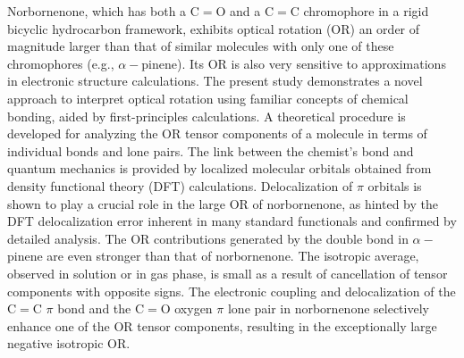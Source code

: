 \documentclass[landscape,a0b,final]{a0poster}
\newenvironment{poster}{
  \begin{center}
  \begin{minipage}[c]{0.98\textwidth}
}{
  \end{minipage} 
  \end{center}
}
\newenvironment{pcolumn}[1]{
  \begin{minipage}{#1\textwidth}
  \begin{center}
}{
  \end{center}
  \end{minipage}
}
\newcommand{\pbox}[4]{
\psshadowbox[#3]{
\begin{minipage}[t][#2][t]{#1}
#4
\end{minipage}
}}
\begin{document}
\begin{poster}
\begin{center}
\begin{pcolumn}{0.98}
{}
\end{pcolumn}
\end{center}

\vspace*{2cm}


\begin{multicols}{3}

\begin{center}\pbox{0.8\columnwidth}{}{linewidth=2mm,framearc=0.3,linecolor=ubblue,fillstyle=gradient,gradangle=0,gradbegin=white,gradend=ubgray,gradmidpoint=1.0,framesep=1em}{\begin{center} \Large \color{ubblue}{\bf{Abstract}}\end{center}}\end{center}
\vspace{0.5cm}
Norbornenone, which has both a C$=$O and a C$=$C chromophore in a rigid bicyclic hydrocarbon framework,
exhibits optical rotation (OR) an order of magnitude larger than that of similar molecules with only one of these chromophores
(e.g., $\alpha-$pinene). Its OR is also very sensitive to approximations in electronic structure calculations. The present study
demonstrates a novel approach to interpret optical rotation using familiar concepts of chemical bonding, aided by first-principles
calculations. A theoretical procedure is developed for analyzing the OR tensor components of a molecule in terms of individual
bonds and lone pairs. The link between the chemist’s bond and quantum mechanics is provided by localized molecular orbitals
obtained from density functional theory (DFT) calculations. Delocalization of $\pi$ orbitals is shown to play a crucial role in the
large OR of norbornenone, as hinted by the DFT delocalization error inherent in many standard functionals and confirmed by
detailed analysis. The OR contributions generated by the double bond in $\alpha-$pinene are even stronger than that of norbornenone.
The isotropic average, observed in solution or in gas phase, is small as a result of cancellation of tensor components with opposite
signs. The electronic coupling and delocalization of the C$=$C $\pi$ bond and the C$=$O oxygen $\pi$ lone pair in norbornenone
selectively enhance one of the OR tensor components, resulting in the exceptionally large negative isotropic OR.


\vspace{2cm}\begin{center}\pbox{0.8\columnwidth}{}{linewidth=2mm,framearc=0.3,linecolor=ubblue,fillstyle=gradient,gradangle=0,gradbegin=white,gradend=ubgray,gradmidpoint=1.0,framesep=1em}{\begin{center} \Large \color{ubblue}{\bf{Functional Tuning}}\end{center}}\end{center}\vspace{1.25cm}


\end{multicols}
\end{poster}
\end{document}
